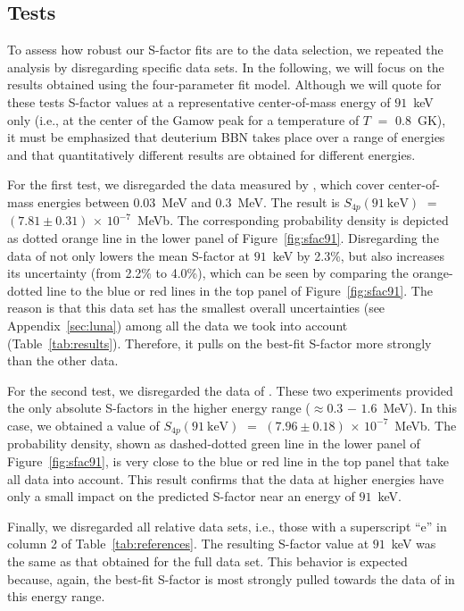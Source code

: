 \documentclass[twocolumn]{aastex63}
\begin{document}
\subsection{Tests} 
\label{sec:resultstests}
To assess how robust our S-factor fits are to the data selection, we repeated the analysis by disregarding specific data sets. In the following, we will focus on the results obtained using the four-parameter fit model. Although we will quote for these tests S-factor values at a representative center-of-mass energy of $91$~keV only (i.e., at the center of the Gamow peak for a temperature of $T$ $=$ $0.8$~GK), it must be emphasized that deuterium BBN takes place over a range of energies and that quantitatively different results are obtained for different energies. 

For the first test, we disregarded the data measured by \citet{Mossa20}, which cover center-of-mass energies between $0.03$~MeV and $0.3$~MeV. The result is $S_{4p}(91~\mathrm{keV})$ $=$ $(7.81\pm0.31)$ $\times$ $10^{-7}$~MeVb. The corresponding probability density is depicted as dotted orange line in the lower panel of Figure~\ref{fig:sfac91}. Disregarding the data of \citet{Mossa20} not only lowers the mean S-factor at $91$~keV by 2.3\%, but also increases its uncertainty (from 2.2\% to 4.0\%), which can be seen by comparing the orange-dotted line to the blue or red lines in the top panel of Figure~\ref{fig:sfac91}. The reason is that this data set has the smallest overall uncertainties (see Appendix~\ref{sec:luna}) among all the data we took into account (Table~\ref{tab:results}). Therefore, it pulls on the best-fit S-factor more strongly than the other data.

For the second test, we disregarded the data of \citet{War63,Turkat21}. These two experiments provided the only absolute S-factors in the higher energy range ($\approx$0.3 $-$ $1.6$~MeV). In this case, we obtained a value of $S_{4p}(91~\mathrm{keV})$ $=$ $(7.96\pm0.18)$ $\times$ $10^{-7}$~MeVb. The probability density, shown as dashed-dotted green line in the lower panel of Figure~\ref{fig:sfac91}, is very close to the blue or red line in the top panel that take all data into account. This result confirms that the data at higher energies have only a small impact on the predicted S-factor near an energy of $91$~keV. 

Finally, we disregarded all relative data sets, i.e., those with a superscript ``e'' in column 2 of Table~\ref{tab:references}. The resulting S-factor value at $91$~keV was the same as that obtained for the full data set. This behavior is expected because, again, the best-fit S-factor is most strongly pulled towards the data of \citet{Mossa20} in this energy range. 
\end{document}
